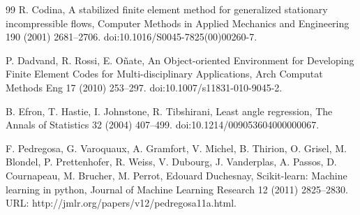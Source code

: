 \documentclass[11pt]{article}
\begin{document}
\begin{thebibliography}{99}
R. Codina, A stabilized finite element method for generalized stationary incompressible flows, Computer Methods in Applied Mechanics and Engineering 190 (2001) 2681--2706. doi:10.1016/S0045-7825(00)00260-7.

P. Dadvand, R. Rossi, E. O\~nate, An Object-oriented Environment for Developing Finite Element Codes for Multi-disciplinary Applications, Arch Computat Methods Eng 17 (2010) 253--297. doi:10.1007/s11831-010-9045-2.

B. Efron, T. Hastie, I. Johnstone, R. Tibshirani, Least angle regression, The Annals of Statistics 32 (2004) 407--499. doi:10.1214/009053604000000067.

F. Pedregosa, G. Varoquaux, A. Gramfort, V. Michel, B. Thirion, O. Grisel, M. Blondel, P. Prettenhofer, R. Weiss, V. Dubourg, J. Vanderplas, A. Passos, D. Cournapeau, M. Brucher, M. Perrot, Edouard Duchesnay, Scikit-learn: Machine learning in python, Journal of Machine Learning Research 12 (2011) 2825--2830. URL: http://jmlr.org/papers/v12/pedregosa11a.html.

\end{thebibliography}
\end{document}
